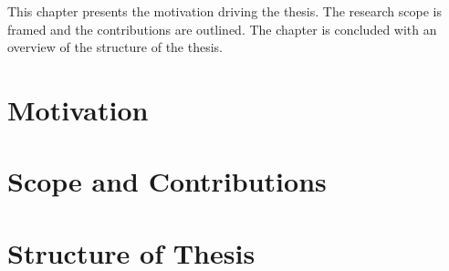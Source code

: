 This chapter presents the motivation driving the thesis. The research scope is framed and the contributions are outlined. The chapter is concluded with an overview of the structure of the thesis.

\section{Motivation}
\label{sec:Introduction:Motivation}


\section{Scope and Contributions}
\label{sec:Introduction:ScopeAndContributions}


%

\section{Structure of Thesis}
\label{sec:Introduction:StructureOfThesis}

